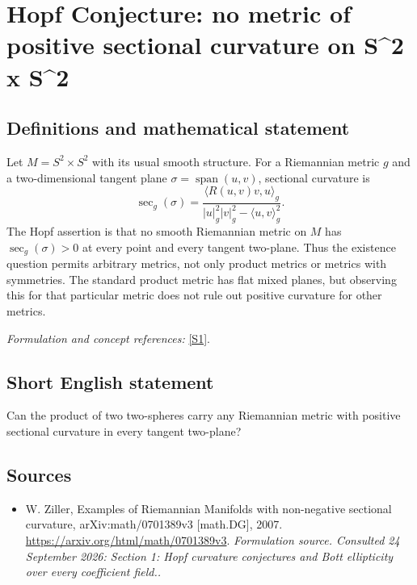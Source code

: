 \documentclass[11pt]{article}
\begin{document}
\section*{\texorpdfstring{Hopf Conjecture: no metric of positive sectional curvature on S\textasciicircum{}2 x S\textasciicircum{}2}{Hopf Conjecture: no metric of positive sectional curvature on S\textasciicircum{}2 x S\textasciicircum{}2}}\label{30006874}
\subsection{Definitions and mathematical statement}
Let $M=S^2\times S^2$ with its usual smooth structure. For a Riemannian metric $g$ and a two-dimensional tangent plane $\sigma=\operatorname{span}(u,v)$, sectional curvature is
\[
 \sec_g(\sigma)=\frac{\langle R(u,v)v,u\rangle_g}
 {|u|_g^2|v|_g^2-\langle u,v\rangle_g^2}.
\]
The Hopf assertion is that no smooth Riemannian metric on $M$ has $\sec_g(\sigma)>0$ at every point and every tangent two-plane. Thus the existence question permits arbitrary metrics, not only product metrics or metrics with symmetries. The standard product metric has flat mixed planes, but observing this for that particular metric does not rule out positive curvature for other metrics.
\par\smallskip\textit{Formulation and concept references:} \href{https://arxiv.org/html/math/0701389v3}{[S1]}.

\subsection{Short English statement}
Can the product of two two-spheres carry any Riemannian metric with positive sectional curvature in every tangent two-plane?
\subsection{Sources}
\begin{itemize}
\item[S1]W. Ziller, Examples of Riemannian Manifolds with non-negative sectional curvature, arXiv:math/0701389v3 [math.DG], 2007.
\url{https://arxiv.org/html/math/0701389v3}.
\textit{Formulation source. Consulted 24 September 2026: Section 1: Hopf curvature conjectures and Bott ellipticity over every coefficient field..}
\end{itemize}
\end{document}
